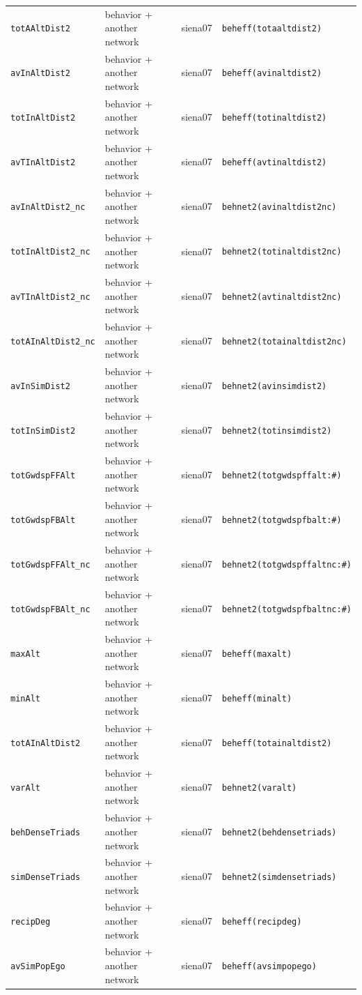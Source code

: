 \begin{longtable}{@{}p{2.6cm}p{3.2cm}p{2.9cm}p{5.4cm}@{}}
\texttt{totAAltDist2} & behavior + another network & siena07 & \texttt{beheff(totaaltdist2)}\\
\texttt{avInAltDist2} & behavior + another network & siena07 & \texttt{beheff(avinaltdist2)}\\
\texttt{totInAltDist2} & behavior + another network & siena07 & \texttt{beheff(totinaltdist2)}\\
\texttt{avTInAltDist2} & behavior + another network & siena07 & \texttt{beheff(avtinaltdist2)}\\
\texttt{avInAltDist2\_nc} & behavior + another network & siena07 & \texttt{behnet2(avinaltdist2nc)}\\
\texttt{totInAltDist2\_nc} & behavior + another network & siena07 & \texttt{behnet2(totinaltdist2nc)}\\
\texttt{avTInAltDist2\_nc} & behavior + another network & siena07 & \texttt{behnet2(avtinaltdist2nc)}\\
\texttt{totAInAltDist2\_nc} & behavior + another network & siena07 & \texttt{behnet2(totainaltdist2nc)}\\
\texttt{avInSimDist2} & behavior + another network & siena07 & \texttt{behnet2(avinsimdist2)}\\
\texttt{totInSimDist2} & behavior + another network & siena07 & \texttt{behnet2(totinsimdist2)}\\
\texttt{totGwdspFFAlt} & behavior + another network & siena07 & \texttt{behnet2(totgwdspffalt:\#)}\\
\texttt{totGwdspFBAlt} & behavior + another network & siena07 & \texttt{behnet2(totgwdspfbalt:\#)}\\
\texttt{totGwdspFFAlt\_nc} & behavior + another network & siena07 & \texttt{behnet2(totgwdspffaltnc:\#)}\\
\texttt{totGwdspFBAlt\_nc} & behavior + another network & siena07 & \texttt{behnet2(totgwdspfbaltnc:\#)}\\
\texttt{maxAlt} & behavior + another network & siena07 & \texttt{beheff(maxalt)}\\
\texttt{minAlt} & behavior + another network & siena07 & \texttt{beheff(minalt)}\\
\texttt{totAInAltDist2} & behavior + another network & siena07 & \texttt{beheff(totainaltdist2)}\\
\texttt{varAlt} & behavior + another network & siena07 & \texttt{behnet2(varalt)}\\
\texttt{behDenseTriads} & behavior + another network & siena07 & \texttt{behnet2(behdensetriads)}\\
\texttt{simDenseTriads} & behavior + another network & siena07 & \texttt{behnet2(simdensetriads)}\\
\texttt{recipDeg} & behavior + another network & siena07 & \texttt{beheff(recipdeg)}\\
\texttt{avSimPopEgo} & behavior + another network & siena07 & \texttt{beheff(avsimpopego)}\\
\bottomrule
\end{longtable}
\normalsize

